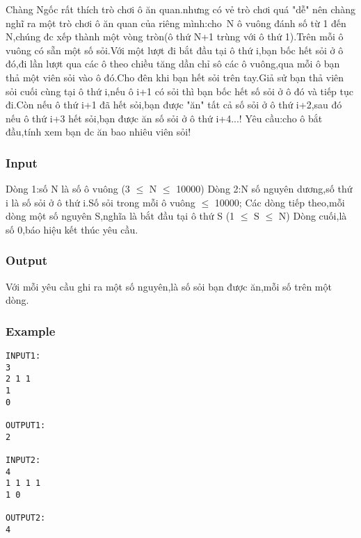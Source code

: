 

Chàng Ngốc rất thích trò chơi ô ăn quan.nhưng có vẻ trò chơi quá "dễ" nên chàng nghĩ ra một trò chơi ô ăn quan của riêng mình:cho N ô vuông đánh số từ 1 đến N,chúng đc xếp thành một vòng tròn(ô thứ N+1 trùng với ô thứ 1).Trên mỗi ô vuông có sẵn một số sỏi.Với một lượt đi bắt đầu tại ô thứ i,bạn bốc hết sỏi ở ô đó,đi lần lượt qua các ô theo chiều tăng dần chỉ sô các ô vuông,qua mỗi ô bạn thả một viên sỏi vào ô đó.Cho đên khi bạn hết sỏi trên tay.Giả sử bạn thả viên sỏi cuối cùng tại ô thứ i,nếu ô i+1 có sỏi thì bạn bốc hết số sỏi ở ô đó và tiếp tục đi.Còn nếu ô thứ i+1 đã hết sỏi,bạn được "ăn" tất cả số sỏi ở ô thứ i+2,sau đó nếu ô thứ i+3 hết sỏi,bạn được ăn số sỏi ở ô thứ i+4...! Yêu cầu:cho ô bắt đầu,tính xem bạn dc ăn bao nhiêu viên sỏi!

\subsubsection{Input}

Dòng 1:số N là số ô vuông (3 $\le$ N $\le$ 10000) Dòng 2:N số nguyên dương,số thứ i là số sỏi ở ô thứ i.Số sỏi trong mỗi ô vuông  $\le$ 10000; Các dòng tiếp theo,mỗi dòng một số nguyên S,nghĩa là bắt đầu tại ô thứ S (1 $\le$ S $\le$ N) Dòng cuối,là số 0,báo hiệu kết thúc yêu cầu.

\subsubsection{Output}

Với mỗi yêu cầu ghi ra một số nguyên,là số sỏi bạn được ăn,mỗi số trên một dòng.

\subsubsection{Example}
\begin{verbatim}
INPUT1:
3
2 1 1
1
0

OUTPUT1:
2

INPUT2:
4
1 1 1 1
1 0

OUTPUT2:
4\end{verbatim}
